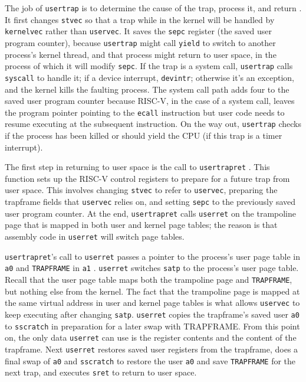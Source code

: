 The job of {\tt usertrap} is to determine
the cause of the trap, process it, and return
.
It first changes {\tt stvec} so
that a trap while in the kernel will be handled by
{\tt kernelvec} rather than {\tt uservec}.
It saves the {\tt sepc} register (the saved user program counter),
because 
{\tt usertrap} might call \lstinline{yield} to switch
to another process's kernel thread, and that process might return
to user space, in the process of which it will modify \lstinline{sepc}.
If the trap is a system call, {\tt usertrap} calls {\tt syscall} to
handle it;
if a device interrupt, {\tt devintr};
otherwise it's an exception, and the kernel kills the
faulting process.
The system call path adds four to the saved user program counter
because RISC-V, in the case of a system call,
leaves the program pointer pointing to the {\tt ecall} instruction
but user code needs to resume executing at the subsequent instruction.
On the way out, {\tt usertrap} checks if the process has been
killed or should yield the CPU (if this trap is a timer interrupt).

The first step in returning to user space is the call to {\tt usertrapret}
.
This function sets up the RISC-V control registers to prepare for a
future trap from user space. This involves changing {\tt stvec}
to refer to {\tt uservec}, preparing the trapframe fields that
{\tt uservec} relies on, and setting {\tt sepc} to the previously
saved user program counter. At the end, {\tt usertrapret}
calls {\tt userret} on the trampoline page that is mapped in
both user and kernel page tables; the reason is that assembly
code in {\tt userret} will switch page tables.

{\tt usertrapret}'s call to {\tt userret} passes a pointer to the process's user
page table in {\tt a0} and {\tt TRAPFRAME} in {\tt a1}
.
{\tt userret} switches {\tt satp} to the process's user page table.
Recall that the user page table maps both the trampoline page
and {\tt TRAPFRAME}, but nothing else from the kernel.
The fact that the trampoline page is mapped at the same
virtual address in user and kernel page tables is what allows
{\tt uservec} to keep executing after changing {\tt satp}.
{\tt userret} copies the trapframe's saved user {\tt a0} to {\tt sscratch}
in preparation for a later swap with TRAPFRAME.
From this point on, the only data {\tt userret} can use is
the register contents and the content of the trapframe.
Next {\tt userret} restores saved user registers from the trapframe,
does a final swap of {\tt a0} and {\tt sscratch} to restore the
user {\tt a0} and save {\tt TRAPFRAME} for the next trap,
and executes {\tt sret} to return to user space.

